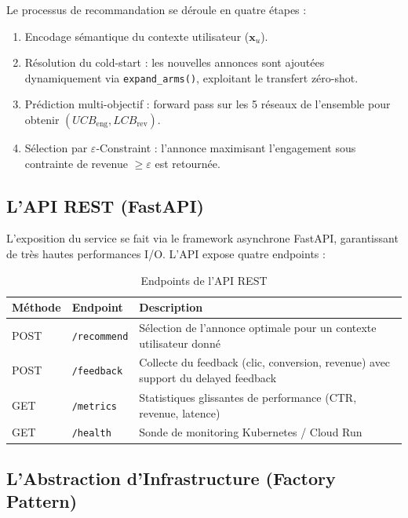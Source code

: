 Le processus de recommandation se déroule en quatre étapes :

\begin{enumerate}
    \item Encodage sémantique du contexte utilisateur ($\mathbf{x}_u$).
    \item Résolution du cold-start : les nouvelles annonces sont ajoutées dynamiquement via \texttt{expand\_arms()}, exploitant le transfert zéro-shot.
    \item Prédiction multi-objectif : forward pass sur les 5 réseaux de l'ensemble pour obtenir $(UCB_{\text{eng}}, LCB_{\text{rev}})$.
    \item Sélection par $\varepsilon$-Constraint : l'annonce maximisant l'engagement sous contrainte de revenue $\geq \varepsilon$ est retournée.
\end{enumerate}

\subsection{L'API REST (FastAPI)}

L'exposition du service se fait via le framework asynchrone FastAPI, garantissant de très hautes performances I/O. L'API expose quatre endpoints :

\begin{table}
    
    \begin{tabular}{l l p{7cm}}
        \hline
        \textbf{Méthode} & \textbf{Endpoint} & \textbf{Description} \\
        \hline
        POST & \texttt{/recommend} & Sélection de l'annonce optimale pour un contexte utilisateur donné \\
        POST & \texttt{/feedback} & Collecte du feedback (clic, conversion, revenue) avec support du delayed feedback \\
        GET  & \texttt{/metrics}   & Statistiques glissantes de performance (CTR, revenue, latence) \\
        GET  & \texttt{/health}    & Sonde de monitoring Kubernetes / Cloud Run \\
        \hline
    \end{tabular}
    \caption{Endpoints de l'API REST}
    \label{tab:api_endpoints}
\end{table}

\subsection{L'Abstraction d'Infrastructure (Factory Pattern)}

